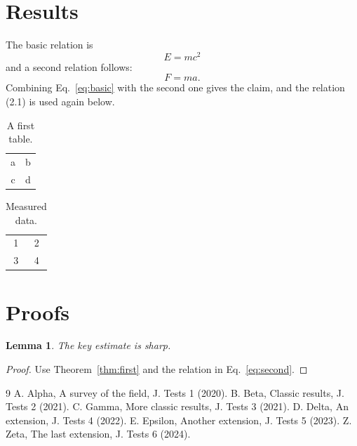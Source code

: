 \documentclass[11pt]{article}
\numberwithin{equation}{section}
\newtheorem{lemma}{Lemma}[section]
\begin{document}
\section{Results}
\label{sec:results}
The basic relation is
\begin{equation}
  \label{eq:basic}
  E = m c^2
\end{equation}
and a second relation follows:
\begin{equation}
  \label{eq:second}
  F = m a .
\end{equation}
Combining Eq.~\eqref{eq:basic} with the second one gives the claim, and
the relation (2.1) is used again below.

\begin{table}[h]
  \centering
  \caption{A first table.}
  \begin{tabular}{cc} a & b \\ c & d \end{tabular}
\end{table}

\begin{table}[h]
  \centering
  \caption{Measured data.}
  \label{tab:data}
  \begin{tabular}{cc} 1 & 2 \\ 3 & 4 \end{tabular}
\end{table}
\clearpage

\section{Proofs}
\begin{lemma}
\label{lem:key}
The key estimate is sharp.
\end{lemma}
\begin{proof}
Use Theorem~\ref{thm:first} and the relation in Eq.~\eqref{eq:second}.
\end{proof}
\clearpage

\begin{thebibliography}{9}
 A. Alpha, A survey of the field, J. Tests 1 (2020).
 B. Beta, Classic results, J. Tests 2 (2021).
 C. Gamma, More classic results, J. Tests 3 (2021).
 D. Delta, An extension, J. Tests 4 (2022).
 E. Epsilon, Another extension, J. Tests 5 (2023).
 Z. Zeta, The last extension, J. Tests 6 (2024).
\end{thebibliography}
\end{document}
